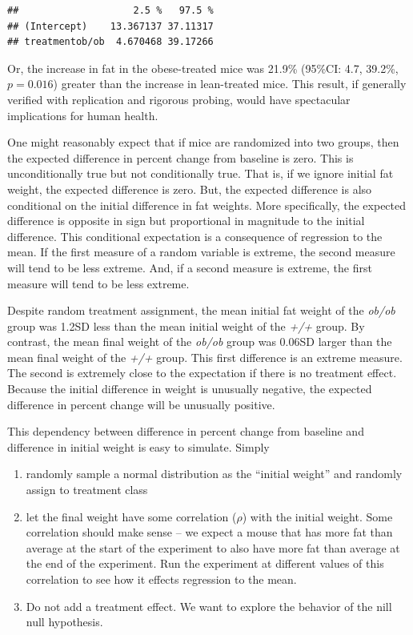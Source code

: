 \documentclass[]{book}
\providecommand{\tightlist}{%
  \setlength{\itemsep}{0pt}\setlength{\parskip}{0pt}}
\begin{document}
\begin{verbatim}
##                    2.5 %   97.5 %
## (Intercept)    13.367137 37.11317
## treatmentob/ob  4.670468 39.17266
\end{verbatim}

Or, the increase in fat in the obese-treated mice was 21.9\% (95\%CI:
4.7, 39.2\%, \(p=0.016\)) greater than the increase in lean-treated
mice. This result, if generally verified with replication and rigorous
probing, would have spectacular implications for human health.

One might reasonably expect that if mice are randomized into two groups,
then the expected difference in percent change from baseline is zero.
This is unconditionally true but not conditionally true. That is, if we
ignore initial fat weight, the expected difference is zero. But, the
expected difference is also conditional on the initial difference in fat
weights. More specifically, the expected difference is opposite in sign
but proportional in magnitude to the initial difference. This
conditional expectation is a consequence of regression to the mean. If
the first measure of a random variable is extreme, the second measure
will tend to be less extreme. And, if a second measure is extreme, the
first measure will tend to be less extreme.

Despite random treatment assignment, the mean initial fat weight of the
\emph{ob/ob} group was 1.2SD less than the mean initial weight of the
\emph{+/+} group. By contrast, the mean final weight of the \emph{ob/ob}
group was 0.06SD larger than the mean final weight of the \emph{+/+}
group. This first difference is an extreme measure. The second is
extremely close to the expectation if there is no treatment effect.
Because the initial difference in weight is unusually negative, the
expected difference in percent change will be unusually positive.

This dependency between difference in percent change from baseline and
difference in initial weight is easy to simulate. Simply

\begin{enumerate}
\def\labelenumi{\arabic{enumi}.}
\tightlist
\item
  randomly sample a normal distribution as the ``initial weight'' and
  randomly assign to treatment class
\item
  let the final weight have some correlation (\(\rho\)) with the initial
  weight. Some correlation should make sense -- we expect a mouse that
  has more fat than average at the start of the experiment to also have
  more fat than average at the end of the experiment. Run the experiment
  at different values of this correlation to see how it effects
  regression to the mean.
\item
  Do not add a treatment effect. We want to explore the behavior of the
  nill null hypothesis.
\end{enumerate}
\end{document}

